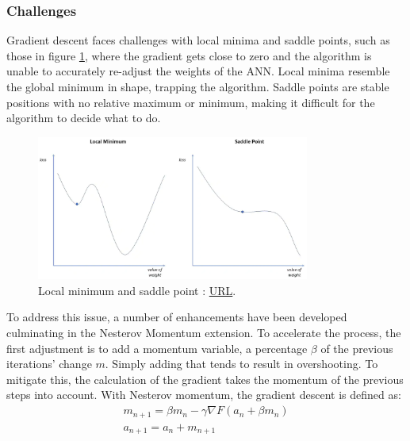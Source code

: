 \subsubsection{Challenges}
Gradient descent faces challenges with local minima and saddle points, such as those in figure \ref{fig:Local minimum and saddle point}, where the gradient gets close to zero and the algorithm is unable to accurately re-adjust the weights of the ANN. Local minima resemble the global minimum in shape, trapping the algorithm. Saddle points are stable positions with no relative maximum or minimum, making it difficult for the algorithm to decide what to do.
\begin{figure}[H]
    \centering
        \includegraphics[width=0.8\textwidth]{Images/diagrams/LocalMinimum_SaddlePoints.png}
        \decoRule
        \caption[Local minimum and saddle point]{Local minimum and saddle point \cite{IBM_Gradient_Descent}: \href{https://www.ibm.com/cloud/learn/gradient-descent}{URL}.}
        \label{fig:Local minimum and saddle point}
\end{figure}

To address this issue, a number of enhancements have been developed culminating in the Nesterov Momentum\cite{nesterov_momentum} extension. To accelerate the process, the first adjustment is to add a momentum variable, a percentage \(\beta\) of the previous iterations' change \(m\). Simply adding that tends to result in overshooting. To mitigate this, the calculation of the gradient takes the momentum of the previous steps into account. With Nesterov momentum, the gradient descent is defined as:
\begin{equation}
    \begin{gathered} 
        m_{n+1} = \beta m_n - \gamma \nabla F \left( a_n + \beta m_n \right)\\
        a_{n+1} = a_n + m_{n+1}\\
    \end{gathered}
	\label{eqn:Gradient Descent with Nesterov momentum}
\end{equation}

